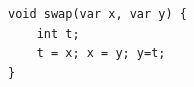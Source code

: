 \documentclass{jarticle}
\begin{document}
 \begin{verbatim}
void swap(var x, var y) {
    int t;
    t = x; x = y; y=t;
}
 \end{verbatim}
\end{document}
